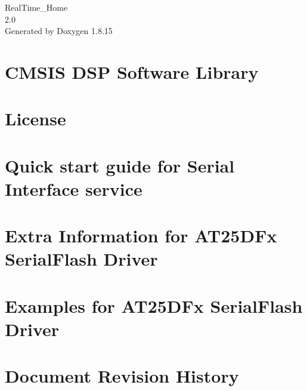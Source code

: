 \let\mypdfximage\pdfximage\def\pdfximage{\immediate\mypdfximage}\documentclass[twoside]{book}
\newcommand{\+}{\discretionary{\mbox{\scriptsize$\hookleftarrow$}}{}{}}
\newcommand{\clearemptydoublepage}{%
  \newpage{\pagestyle{empty}\cleardoublepage}%
}
\begin{document}
\hypersetup{pageanchor=false,
             bookmarksnumbered=true,
             pdfencoding=unicode
            }
\begin{titlepage}
\vspace*{7cm}
\begin{center}%
{\Large Real\+Time\+\_\+\+Home \\[1ex]\large 2.\+0 }\\
\vspace*{1cm}
{\large Generated by Doxygen 1.8.15}\\
\end{center}
\end{titlepage}
\clearemptydoublepage
{}
\tableofcontents
\clearemptydoublepage
{}
\hypersetup{pageanchor=true}

\chapter{C\+M\+S\+IS D\+SP Software Library}
\label{index}\hypertarget{index}{}
\chapter{License}
\label{_license}

\chapter{Quick start guide for Serial Interface service}
\label{serial_quickstart}

\chapter{Extra Information for A\+T25\+D\+Fx Serial\+Flash Driver}
\label{asfdoc_common2_at25dfx_extra}

\chapter{Examples for A\+T25\+D\+Fx Serial\+Flash Driver}
\label{asfdoc_common2_at25dfx_exqsg}

\chapter{Document Revision History}
\label{asfdoc_common2_at25dfx_document_revision_history}

\end{document}
